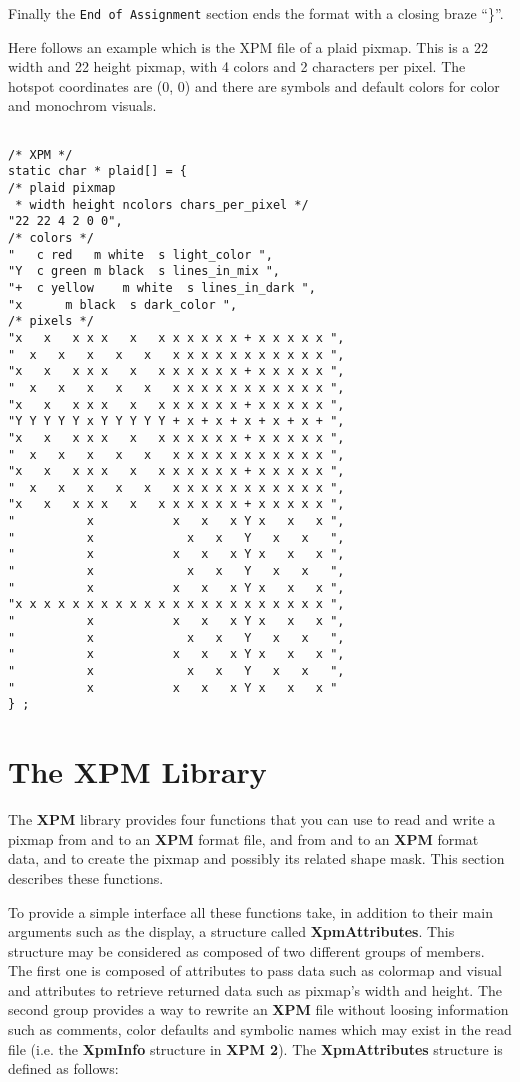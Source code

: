 Finally the {\tt End of Assignment} section ends the format with a closing
braze ``\}''.

\newpage
Here follows an example which is the XPM file of a plaid pixmap. This is a 22
width and 22 height pixmap, with 4 colors and 2 characters per pixel. The
hotspot coordinates are (0, 0) and there are symbols and default colors for
color and monochrom visuals.

\begin{verbatim}

/* XPM */
static char * plaid[] = {
/* plaid pixmap 
 * width height ncolors chars_per_pixel */
"22 22 4 2 0 0",
/* colors */
"   c red 	m white  s light_color ",
"Y  c green	m black  s lines_in_mix ",
"+  c yellow	m white  s lines_in_dark ",
"x 		m black  s dark_color ",
/* pixels */
"x   x   x x x   x   x x x x x x + x x x x x ", 
"  x   x   x   x   x   x x x x x x x x x x x ", 
"x   x   x x x   x   x x x x x x + x x x x x ", 
"  x   x   x   x   x   x x x x x x x x x x x ", 
"x   x   x x x   x   x x x x x x + x x x x x ", 
"Y Y Y Y Y x Y Y Y Y Y + x + x + x + x + x + ", 
"x   x   x x x   x   x x x x x x + x x x x x ", 
"  x   x   x   x   x   x x x x x x x x x x x ", 
"x   x   x x x   x   x x x x x x + x x x x x ", 
"  x   x   x   x   x   x x x x x x x x x x x ", 
"x   x   x x x   x   x x x x x x + x x x x x ", 
"          x           x   x   x Y x   x   x ", 
"          x             x   x   Y   x   x   ",
"          x           x   x   x Y x   x   x ", 
"          x             x   x   Y   x   x   ", 
"          x           x   x   x Y x   x   x ", 
"x x x x x x x x x x x x x x x x x x x x x x ", 
"          x           x   x   x Y x   x   x ", 
"          x             x   x   Y   x   x   ", 
"          x           x   x   x Y x   x   x ", 
"          x             x   x   Y   x   x   ", 
"          x           x   x   x Y x   x   x "
} ;

\end{verbatim}

\newpage
\section{The {\bf XPM} Library}

The {\bf XPM} library provides four functions that you can use to read and
write a pixmap from and to an {\bf XPM} format file, and from and to an {\bf
XPM} format data, and to create the pixmap and possibly its related shape
mask. This section describes these functions.

\vspace{.5cm}
To provide a simple interface all these functions take, in addition to their
main arguments such as the display, a structure called {\bf XpmAttributes}.
This structure may be considered as composed of two different groups of
members. The first one is composed of attributes to pass data such as colormap
and visual and attributes to retrieve returned data such as pixmap's width and
height. The second group provides a way to rewrite an {\bf XPM} file without
loosing information such as comments, color defaults and symbolic names which
may exist in the read file (i.e. the {\bf XpmInfo} structure in {\bf XPM 2}).
The {\bf XpmAttributes} structure is defined as follows:

